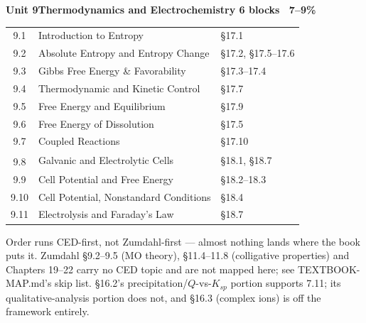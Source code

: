 \documentclass[10pt]{article}
\makeatletter
\newcommand{\uband}[3]{%
  \par\vspace{1pt}\noindent
  \colorbox{apclight}{\begin{minipage}{\dimexpr\linewidth-2\fboxsep\relax}
    \sffamily\bfseries\footnotesize\color{apcaccent}Unit #1\quad#2%
    \hfill\normalfont\footnotesize\color{apcgray}#3
  \end{minipage}}\par\vspace{1pt}%
}
\newcommand{\dg}{\textsuperscript{\dag}}
\newenvironment{utab}{\begin{tabular}{@{}C@{\hspace{2pt}}T@{\hspace{2pt}}Z@{}}}{\end{tabular}\par}
\makeatother
\begin{document}
\begin{minipage}[t]{3.28in}
\uband{9}{Thermodynamics and Electrochemistry}{6 blocks \textbullet\ 7--9\%}
\begin{utab}
9.1 & Introduction to Entropy & \S17.1\\
9.2 & Absolute Entropy and Entropy Change & \S17.2, \S17.5--17.6\\
9.3 & Gibbs Free Energy \& Favorability & \S17.3--17.4\\
9.4 & Thermodynamic and Kinetic Control & \S17.7\\
9.5 & Free Energy and Equilibrium & \S17.9\\
9.6 & Free Energy of Dissolution & \S17.5\\
9.7 & Coupled Reactions & \S17.10\\
9.8\dg & Galvanic and Electrolytic Cells & \S18.1, \S18.7\\
9.9 & Cell Potential and Free Energy & \S18.2--18.3\\
9.10 & Cell Potential, Nonstandard Conditions & \S18.4\\
9.11 & Electrolysis and Faraday's Law & \S18.7\\
\end{utab}
\end{minipage}

\vspace{2pt}
\begin{center}
{\sffamily\scriptsize\color{apcgray}%
Order runs CED-first, not Zumdahl-first --- almost nothing lands where the
book puts it. Zumdahl \S9.2--9.5 (MO theory), \S11.4--11.8 (colligative
properties) and Chapters 19--22 carry no CED topic and are not mapped here;
see TEXTBOOK-MAP.md's skip list. \S16.2's precipitation/$Q$-vs-$K_{sp}$
portion supports 7.11; its qualitative-analysis portion does not, and
\S16.3 (complex ions) is off the framework entirely.}
\end{center}
\end{document}
